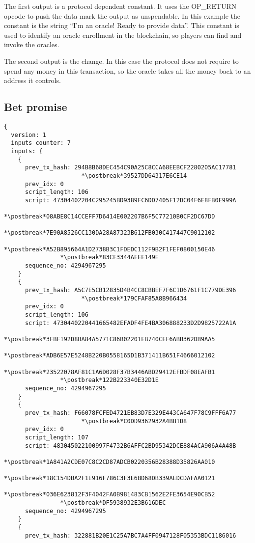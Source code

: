 The first output is a protocol dependent constant. It uses the OP\_RETURN opcode
  to push the data mark the output as unspendable.
In this example the constant is the string
  ``I'm an oracle! Ready to provide data''.
This constant is used to identify an oracle enrollment in the blockchain, so
  players can find and invoke the oracles.

The second output is the change.
In this case the protocol does not require to spend any money in this
  transaction, so the oracle takes all the money back to an address it controls.

\subsection{Bet promise}

\begin{lstlisting}
{
  version: 1
  inputs counter: 7
  inputs: {
    {
      prev_tx_hash: 294B8B68DEC454C90A25C8CCA68EEBCF2280205AC17781
                      *\postbreak*39527DD64317E6CE14
      prev_idx: 0
      script_length: 106
      script: 47304402204C295245BD9389FC6DD7405F12DC04F6E8FB0E999A
                *\postbreak*08ABE8C14CCEFF7D6414E002207B6F5C77210B0CF2DC67DD
                *\postbreak*7E90A8526CC130DA28A87323B612FB030C417447C9012102
                *\postbreak*A52B895664A1D2738B3C1FDEDC112F9B2F1FEF0800150E46
                *\postbreak*83CF3344AEEE149E
      sequence_no: 4294967295
    }
    {
      prev_tx_hash: A5C7E5CB12835D4B4CC8CBBEF7F6C1D6761F1C779DE396
                      *\postbreak*179CFAF85A8B966434
      prev_idx: 0
      script_length: 106
      script: 4730440220441665482EFADF4FE4BA306888233D2D9825722A1A
                *\postbreak*3FBF192D8BA84A5771C86B02201EB740CEF6ABB362DB9AA5
                *\postbreak*ADB6E57E5248B220B0558165D1B371411B651F4666012102
                *\postbreak*23522078AF81C1A6D028F37B3446ABD29412EFBDF08EAFB1
                *\postbreak*122B223340E32D1E
      sequence_no: 4294967295
    }
    {
      prev_tx_hash: F66078FCFED4721EB83D7E329E443CA647F78C9FFF6A77
                      *\postbreak*C0DD9362932A4BB1D8
      prev_idx: 0
      script_length: 107
      script: 483045022100997F4732B6AFFC2BD95342DCE884ACA906A4A48B
                *\postbreak*1A841A2CDE07C8C2CD87ADCB0220356B28388D35826AA010
                *\postbreak*18C154DBA2F1E916F786C3F3E6BD68DB339AEDCDAFAA0121
                *\postbreak*036E623812F3F4042FA0B981483CB1562E2FE3654E90CB52
                *\postbreak*DF5938932E3B616DEC
      sequence_no: 4294967295
    }
    {
      prev_tx_hash: 322881B20E1C25A7BC7A4FF0947128F05353BDC1186016

\end{lstlisting}
